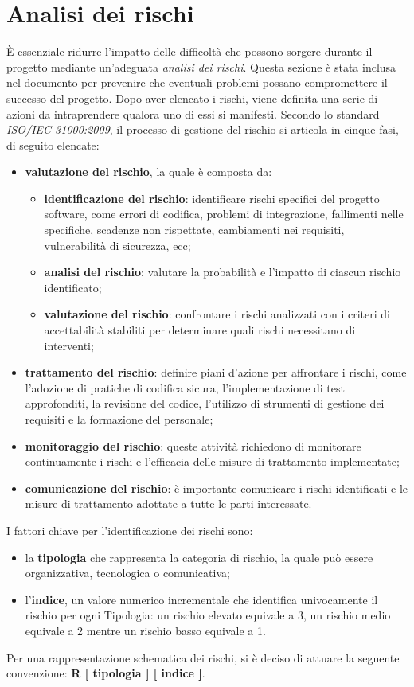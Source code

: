 \section{Analisi dei rischi} %
È essenziale ridurre l'impatto delle difficoltà che possono sorgere durante il progetto mediante un'adeguata \textit{analisi dei rischi}. Questa sezione è stata inclusa nel documento per prevenire che eventuali problemi possano compromettere il successo del progetto. Dopo aver elencato i rischi, viene definita una serie di azioni da intraprendere qualora uno di essi si manifesti. Secondo lo standard \textit{ISO/IEC 31000:2009}, il processo di gestione del rischio si articola in cinque fasi, di seguito elencate:
\begin{itemize}
    \item \textbf{valutazione del rischio}, la quale è composta da:
    \begin{itemize}
        \item \textbf{identificazione del rischio}: identificare rischi specifici del progetto software, come errori di codifica, problemi di integrazione, fallimenti nelle specifiche, scadenze non rispettate, cambiamenti nei requisiti, vulnerabilità di sicurezza, ecc;
        \item \textbf{analisi del rischio}: valutare la probabilità e l'impatto di ciascun rischio identificato;
        \item \textbf{valutazione del rischio}: confrontare i rischi analizzati con i criteri di accettabilità stabiliti per determinare quali rischi necessitano di interventi;
    \end{itemize}
    \item \textbf{trattamento del rischio}: definire piani d'azione per affrontare i rischi, come l'adozione di pratiche di codifica sicura, l'implementazione di test approfonditi, la revisione del codice, l'utilizzo di strumenti di gestione dei requisiti e la formazione del personale;
    \item \textbf{monitoraggio del rischio}: queste attività richiedono di monitorare continuamente i rischi e l'efficacia delle misure di trattamento implementate;
    \item \textbf{comunicazione del rischio}: è importante comunicare i rischi identificati e le misure di trattamento adottate a tutte le parti interessate.
\end{itemize}
I fattori chiave per l'identificazione dei rischi sono:
\begin{itemize}
    \item la \textbf{tipologia} che rappresenta la categoria di rischio, la quale può essere organizzativa, tecnologica o comunicativa;
    \item l'\textbf{indice}, un valore numerico incrementale che identifica univocamente il rischio per ogni Tipologia: un rischio elevato equivale a 3, un rischio medio equivale a 2 mentre un rischio basso equivale a 1.
\end{itemize}
Per una rappresentazione schematica dei rischi, si è deciso di attuare la seguente convenzione: \textbf{R [ tipologia ] [ indice ]}.

